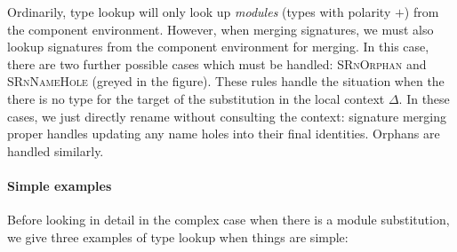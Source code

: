 
Ordinarily, type lookup will only look up \emph{modules} (types
with polarity $+$) from the component environment.  However, when merging
signatures, we must also lookup signatures from the component environment
for merging.  In this case, there are two further possible cases which
must be handled: \textsc{SRnOrphan} and \textsc{SRnNameHole} (greyed in
the figure).  These rules handle the situation when the there is no
type for the target of the substitution in the local context $\Delta$.
In these cases, we just directly rename without consulting the context:
signature merging proper handles updating any name holes into their
final identities.  Orphans are handled similarly.



\paragraph{Simple examples} Before looking in detail in the complex case when there
is a module substitution, we give three examples of type lookup when
things are simple:

